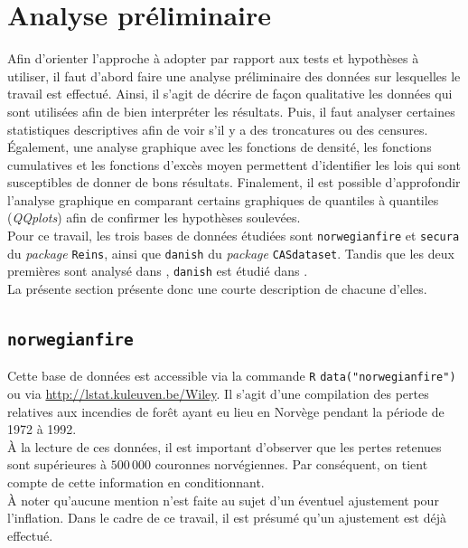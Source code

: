 \section{Analyse préliminaire}\label{Section_AnalysePreliminaire}
Afin d'orienter l'approche à adopter par rapport aux tests et hypothèses à utiliser, il faut d'abord faire une analyse préliminaire des données sur lesquelles le travail est effectué. Ainsi, il s'agit de décrire de façon qualitative les données qui sont utilisées afin de bien interpréter les résultats. Puis, il faut analyser certaines statistiques descriptives afin de voir s'il y a des troncatures ou des censures. Également, une analyse graphique avec les fonctions de densité, les fonctions cumulatives et les fonctions d'excès moyen permettent d'identifier les lois qui sont susceptibles de donner de bons résultats. Finalement, il est possible d'approfondir l'analyse graphique en comparant certains graphiques de quantiles à quantiles (\textit{QQplots}) afin de confirmer les hypothèses soulevées.\\

Pour ce travail, les trois bases de données étudiées sont \texttt{norwegianfire} et \texttt{secura} du \textit{package} \texttt{Reins}, ainsi que \texttt{danish} du \textit{package} \texttt{CASdataset}. Tandis que les deux premières sont analysé dans \cite{norwegianfireEtSecura}, \texttt{danish} est étudié dans \cite{Danish}.\\ 

La présente section présente donc une courte description de chacune d'elles.
	\subsection{\texttt{norwegianfire}}
		Cette base de données est accessible via la commande \texttt{R} \texttt{data("norwegianfire")} ou via \url{http://lstat.kuleuven.be/Wiley}. Il s'agit d'une compilation des pertes relatives aux incendies de forêt ayant eu lieu en Norvège pendant la période de 1972 à 1992.\\ 
		
		À la lecture de ces données, il est important d'observer que les pertes retenues sont supérieures à $500\,000$ couronnes norvégiennes. Par conséquent, on tient compte de cette information en conditionnant.\\
		
		À noter qu'aucune mention n'est faite au sujet d'un éventuel ajustement pour l'inflation. Dans le cadre de ce travail, il est présumé qu'un ajustement est déjà effectué.
		
